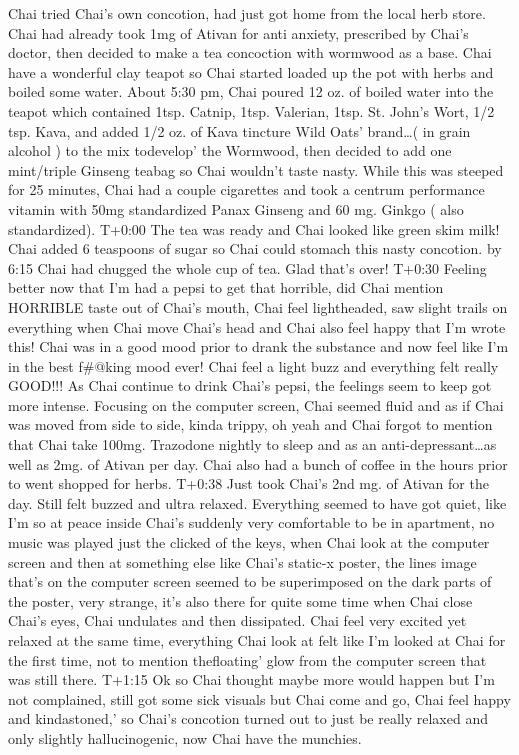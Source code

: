 \documentclass[12pt]{book}
\begin{document}
Chai tried Chai's own concotion, had just got home from the local herb store. Chai had already took 1mg of Ativan for anti anxiety, prescribed by Chai's doctor, then decided to make a tea concoction with wormwood as a base. Chai have a wonderful clay teapot so Chai started loaded up the pot with herbs and boiled some water. About 5:30 pm, Chai poured 12 oz. of boiled water into the teapot which contained 1tsp. Catnip, 1tsp. Valerian, 1tsp. St. John's Wort, 1/2 tsp. Kava, and added 1/2 oz. of Kava tincture Wild Oats' brand\ldots ( in grain alcohol ) to the mix todevelop' the Wormwood, then decided to add one mint/triple Ginseng teabag so Chai wouldn't taste nasty. While this was steeped for 25 minutes, Chai had a couple cigarettes and took a centrum performance vitamin with 50mg standardized Panax Ginseng and 60 mg. Ginkgo ( also standardized). T+0:00 The tea was ready and Chai looked like green skim milk! Chai added 6 teaspoons of sugar so Chai could stomach this nasty concotion. by 6:15 Chai had chugged the whole cup of tea. Glad that's over! T+0:30 Feeling better now that I'm had a pepsi to get that horrible, did Chai mention HORRIBLE taste out of Chai's mouth, Chai feel lightheaded, saw slight trails on everything when Chai move Chai's head and Chai also feel happy that I'm wrote this! Chai was in a good mood prior to drank the substance and now feel like I'm in the best f\#@king mood ever! Chai feel a light buzz and everything felt really GOOD!!! As Chai continue to drink Chai's pepsi, the feelings seem to keep got more intense. Focusing on the computer screen, Chai seemed fluid and as if Chai was moved from side to side, kinda trippy, oh yeah and Chai forgot to mention that Chai take 100mg. Trazodone nightly to sleep and as an anti-depressant\ldots as well as 2mg. of Ativan per day. Chai also had a bunch of coffee in the hours prior to went shopped for herbs. T+0:38 Just took Chai's 2nd mg. of Ativan for the day. Still felt buzzed and ultra relaxed. Everything seemed to have got quiet, like I'm so at peace inside Chai's suddenly very comfortable to be in apartment, no music was played just the clicked of the keys, when Chai look at the computer screen and then at something else like Chai's static-x poster, the lines image that's on the computer screen seemed to be superimposed on the dark parts of the poster, very strange, it's also there for quite some time when Chai close Chai's eyes, Chai undulates and then dissipated. Chai feel very excited yet relaxed at the same time, everything Chai look at felt like I'm looked at Chai for the first time, not to mention thefloating' glow from the computer screen that was still there. T+1:15 Ok so Chai thought maybe more would happen but I'm not complained, still got some sick visuals but Chai come and go, Chai feel happy and kindastoned,' so Chai's concotion turned out to just be really relaxed and only slightly hallucinogenic, now Chai have the munchies.
\end{document}

